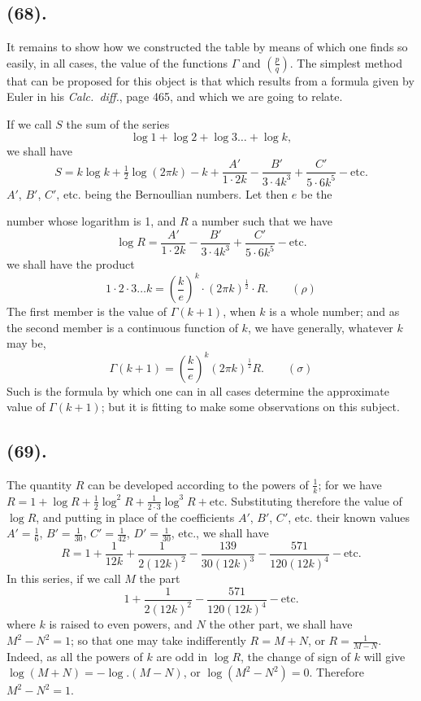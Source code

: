 \documentclass{article}
\begin{document}
\subsection*{(68).}

It remains to show how we constructed the table by means of which one finds so easily, in all cases, the value of the functions $\Gamma$ and $\left(\frac{p}{q}\right)$. The simplest method that can be proposed for this object is that which results from a formula given by Euler in his \emph{Calc.\ diff.}, page 465, and which we are going to relate.

If we call $S$ the sum of the series
\[ \log 1+\log 2+\log 3\ldots+\log k, \]
we shall have
\[ S=k\log k+\tfrac{1}{2}\log(2\pi k)-k+\frac{A'}{1\cdot2k}-\frac{B'}{3\cdot4k^{3}}+\frac{C'}{5\cdot6k^{5}}-\text{etc.} \]
$A'$, $B'$, $C'$, etc. being the Bernoullian numbers. Let then $e$ be the

number whose logarithm is 1, and $R$ a number such that we have
\[ \log R=\frac{A'}{1\cdot2k}-\frac{B'}{3\cdot4k^{3}}+\frac{C'}{5\cdot6k^{5}}-\text{etc.} \]
we shall have the product
\[ 1\cdot2\cdot3\ldots k=\left(\frac{k}{e}\right)^{k}\cdot(2\pi k)^{\frac{1}{2}}\cdot R.\qquad(\rho) \]
The first member is the value of $\Gamma(k+1)$, when $k$ is a whole number; and as the second member is a continuous function of $k$, we have generally, whatever $k$ may be,
\[ \Gamma(k+1)=\left(\frac{k}{e}\right)^{k}(2\pi k)^{\frac{1}{2}}R.\qquad(\sigma) \]
Such is the formula by which one can in all cases determine the approximate value of $\Gamma(k+1)$; but it is fitting to make some observations on this subject.

\subsection*{(69).}

The quantity $R$ can be developed according to the powers of $\frac{1}{k}$; for we have $R=1+\log R+\frac{1}{2}\log^{2}R+\frac{1}{2\cdot3}\log^{3}R+\text{etc.}$ Substituting therefore the value of $\log R$, and putting in place of the coefficients $A'$, $B'$, $C'$, etc. their known values $A'=\frac{1}{6}$, $B'=\frac{1}{30}$, $C'=\frac{1}{42}$, $D'=\frac{1}{30}$, etc., we shall have
\[ R=1+\frac{1}{12k}+\frac{1}{2(12k)^{2}}-\frac{139}{30(12k)^{3}}-\frac{571}{120(12k)^{4}}-\text{etc.} \]
In this series, if we call $M$ the part
\[ 1+\frac{1}{2(12k)^{2}}-\frac{571}{120(12k)^{4}}-\text{etc.} \]
where $k$ is raised to even powers, and $N$ the other part, we shall have $M^{2}-N^{2}=1$; so that one may take indifferently $R=M+N$, or $R=\frac{1}{M-N}$. Indeed, as all the powers of $k$ are odd in $\log R$, the change of sign of $k$ will give $\log(M+N)=-\log.(M-N)$, or $\log(M^{2}-N^{2})=0$. Therefore $M^{2}-N^{2}=1$.
\end{document}

